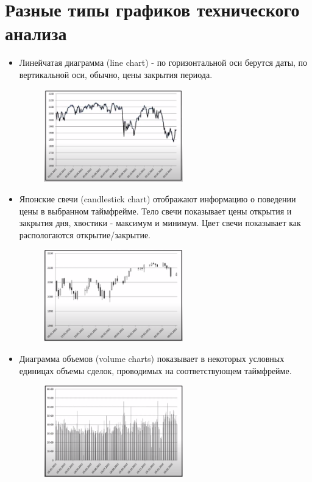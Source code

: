 \documentclass{article}
\begin{document}
\section{Разные типы графиков технического анализа}
\begin{itemize}
    \item Линейчатая диаграмма (line chart) - по горизонтальной оси берутся даты, по вертикальной оси, обычно, цены закрытия периода.
    \begin{figure}[h]
    \centering
    \includegraphics[width=0.57\textwidth]{line chart.png}
    \label{loadings}
    \end{figure}

    \item Японские свечи (candlestick chart) отображают информацию о поведении цены в выбранном таймфрейме. Тело свечи показывает цены открытия и закрытия дня, хвостики - максимум и минимум. Цвет свечи показывает как распологаются открытие/закрытие.
    \begin{figure}[h]
    \centering
    \includegraphics[width=0.57\textwidth]{candlestick chart.png}
    \label{loadings}
    \end{figure}

    \item Диаграмма объемов (volume charts) показывает в некоторых условных единицах объемы сделок, проводимых на соответствующем таймфрейме.
    \begin{figure}[h]
    \centering
    \includegraphics[width=0.57\textwidth]{volume chart.png}
    \label{loadings}
    \end{figure}
\end{itemize}
\end{document}

